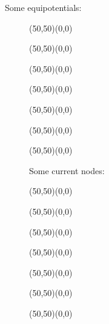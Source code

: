 	Some equipotentials:
	\begin{figure}[H]
		\vspace{1cm}
		\begin{center}
		\begin{picture}(50,50)(0,0)
		\end{picture}
		\begin{picture}(50,50)(0,0)
		\end{picture}
		\begin{picture}(50,50)(0,0)
		\end{picture}
		\begin{picture}(50,50)(0,0)
		\end{picture}
		\begin{picture}(50,50)(0,0)
		\end{picture}
		\begin{picture}(50,50)(0,0)
		\end{picture}
		\begin{picture}(50,50)(0,0)
		\end{picture}
		\end{center}
		
		Some current nodes:
		\begin{center}
		\begin{picture}(50,50)(0,0)
		\end{picture}
		\begin{picture}(50,50)(0,0)
		\end{picture}
		\begin{picture}(50,50)(0,0)
		\end{picture}
		\begin{picture}(50,50)(0,0)
		\end{picture}
		\begin{picture}(50,50)(0,0)
		\end{picture}
		\begin{picture}(50,50)(0,0)
		\end{picture}
		\begin{picture}(50,50)(0,0)
		\end{picture}\\[2cm]
		\end{center}
	\end{figure}
	
